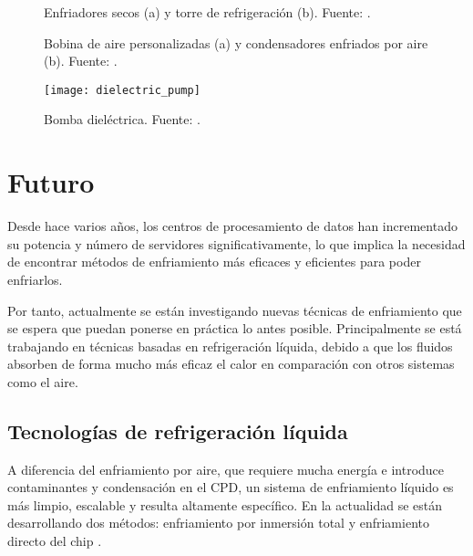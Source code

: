 \begin{figure}%
    \centering
    \qquad
    \caption{Enfriadores secos (a) y torre de refrigeración (b). Fuente: \cite{Kelvion}.}%
    \label{fig:dry_cooler_cooling_tower}%
\end{figure}

\begin{figure}%
    \centering
    \qquad
    \caption{Bobina de aire personalizadas (a) y condensadores enfriados por aire (b). Fuente: \cite{Kelvion}.}
    \label{fig:custom_air_coils_air_cooled_condensers}
\end{figure}

\begin{figure}[H]
    \begin{center}
        \texttt{[image: dielectric\_pump]}
        \caption{Bomba dieléctrica. Fuente: \cite{Kelvion}.}
        \label{dielectric_pump}
    \end{center}
\end{figure}




\section{Futuro} \label{futuro}

Desde hace varios años, los centros de procesamiento de datos han incrementado su potencia y número de servidores significativamente, lo que implica la necesidad de encontrar métodos de enfriamiento más eficaces y eficientes para poder enfriarlos.

Por tanto, actualmente se están investigando nuevas técnicas de enfriamiento que se espera que puedan ponerse en práctica lo antes posible. Principalmente se está trabajando en técnicas basadas en refrigeración líquida, debido a que los fluidos absorben de forma mucho más eficaz el calor en comparación con otros sistemas como el aire.


\subsection{Tecnologías de refrigeración líquida}

A diferencia del enfriamiento por aire, que requiere mucha energía e introduce contaminantes y condensación en el CPD, un sistema de enfriamiento líquido es más limpio, escalable y resulta altamente específico. En la actualidad se están desarrollando dos métodos: enfriamiento por inmersión total y enfriamiento directo del chip \cite{datacenters-future}.


